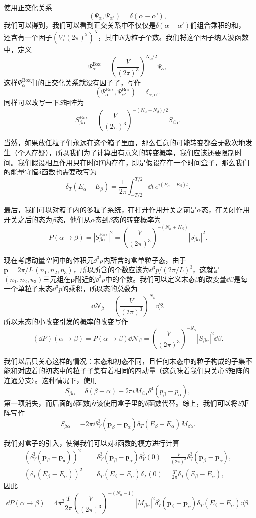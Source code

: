 \documentclass[9pt]{extbook}
\begin{document}
使用正交化关系
\[
(\Psi_\alpha,\Psi_{\alpha'})=\delta(\alpha-\alpha'),
\]
我们可以得到，我们可以看到正交关系中不仅仅是$\delta(\alpha-\alpha')$们组合乘积的和，还含有一个因子$(V/(2\pi)^3)^N$，其中$N$为粒子个数。我们将这个因子纳入波函数中，定义
\[
	\Psi_\alpha^{\text{Box}}=\left(\frac{V}{(2\pi)^3}\right)^{N_\alpha/2}\Psi_\alpha,
\]
这样$\Psi_\alpha^{\text{Box}}$们的正交化关系就没有因子了，写作
\[
\left(\Psi_\alpha^{\text{Box}},\Psi_{\alpha'}^{\text{Box}}\right)=\delta_{\alpha,\alpha'}.
\]
同样可以改写一下$S$矩阵为
\[
S_{\beta\alpha}^{\text{Box}}=\left(\frac{V}{(2\pi)^3}\right)^{-(N_\alpha+N_\beta)/2}S_{\beta\alpha}.
\]

当然，如果放任粒子们永远在这个箱子里面，那么任意的可能转变都会无数次地发生（个人存疑），所以我们为了计算出有意义的转变概率，我们应该还要限制时间。我们假设相互作用只在时间$T$内存在，即是假设存在一个时间盒子，那么我们的能量守恒$\delta$函数也需要改写为
\[
	\delta_T(E_\alpha-E_\beta)=\frac{1}{2\pi}\int_{-T/2}^{T/2}\dd t \,e^{i(E_\alpha-E_\beta)t}.
\]

最后，我们可以对箱子内的多粒子系统，在打开作用开关之前是$\alpha$态，在关闭作用开关之后的态为$\beta$态，他们从$\alpha$态到$\beta$态的转变概率为
\[
	P(\alpha\to\beta)=\left|S_{\beta\alpha}^{\text{Box}}\right|^2=\left(\frac{V}{(2\pi)^3}\right)^{-(N_\alpha+N_\beta)}\left|S_{\beta\alpha}\right|^2.
\]

现在考虑动量空间中的体积元$\dd^3 p$内所含的盒单粒子态，由于$\bm{p}=2\pi/L\,(n_1,n_2,n_3)$，所以所含的个数应该为$\dd^3 p/(2\pi/L)^3$，这就是$(n_1,n_2,n_3)$三元组在$\bm{p}$附近的$\dd^3 p$中的个数。我们可以定义末态$\beta$的改变量$\dd \beta$是每一个单粒子末态$\dd^3 p$的乘积，所以态的总数为
\[
	\dd \mathcal{N}_\beta=\left(\frac{V}{(2\pi)^3}\right)^{N_\beta}\dd \beta.
\]
所以末态的小改变引发的概率的改变写作
\[
	(\dd P)(\alpha\to\beta)=P(\alpha\to\beta)\dd \mathcal{N}_\beta=\left(\frac{V}{(2\pi)^3}\right)^{-N_\alpha}\left|S_{\beta\alpha}\right|^2\dd \beta.
\]

我们以后只关心这样的情况：末态和初态不同，且任何末态中的粒子构成的子集不能和对应着的初态中的粒子子集有着相同的四动量（这意味着我们只关心$S$矩阵的连通分支）。这种情况下，使用
\[
S_{\beta\alpha}=\delta(\beta-\alpha)-2\pi iM_{\beta\alpha}\delta^4(p_\beta-p_\alpha),
\]
第一项消失，而后面的$\delta$函数应该使用盒子里的$\delta$函数代替。综上，我们可以将$S$矩阵写作
\[
S_{\beta\alpha}=-2\pi i \delta^3_V(\bm{p}_\beta-\bm{p}_\alpha)\delta_T(E_\beta-E_\alpha)M_{\beta\alpha}.
\]

我们对盒子的引入，使得我们可以对$\delta$函数的模方进行计算
\[
	\begin{split}
	\left(\delta^3_V(\bm{p}_\beta-\bm{p}_\alpha)\right)^2&=\delta^3_V(\bm{p}_\beta-\bm{p}_\alpha)\delta^3_V(0)=\frac{V}{(2\pi)^3}\delta^3_V(\bm{p}_\beta-\bm{p}_\alpha),\\
	\left(\delta_T(E_\beta-E_\alpha)\right)^2&=\delta_T(E_\beta-E_\alpha)\delta_T(0)=\frac{T}{2\pi}\delta_T(E_\beta-E_\alpha),
	\end{split}
\]
因此
\[
	\dd P(\alpha\to\beta)=4\pi^2\frac{T}{2\pi}\left(\frac{V}{(2\pi)^3}\right)^{-(N_\alpha-1)}\left|M_{\beta\alpha}\right|^2\delta^3_V(\bm{p}_\beta-\bm{p}_\alpha)\delta_T(E_\beta-E_\alpha)\dd \beta.
\]
\end{document}
